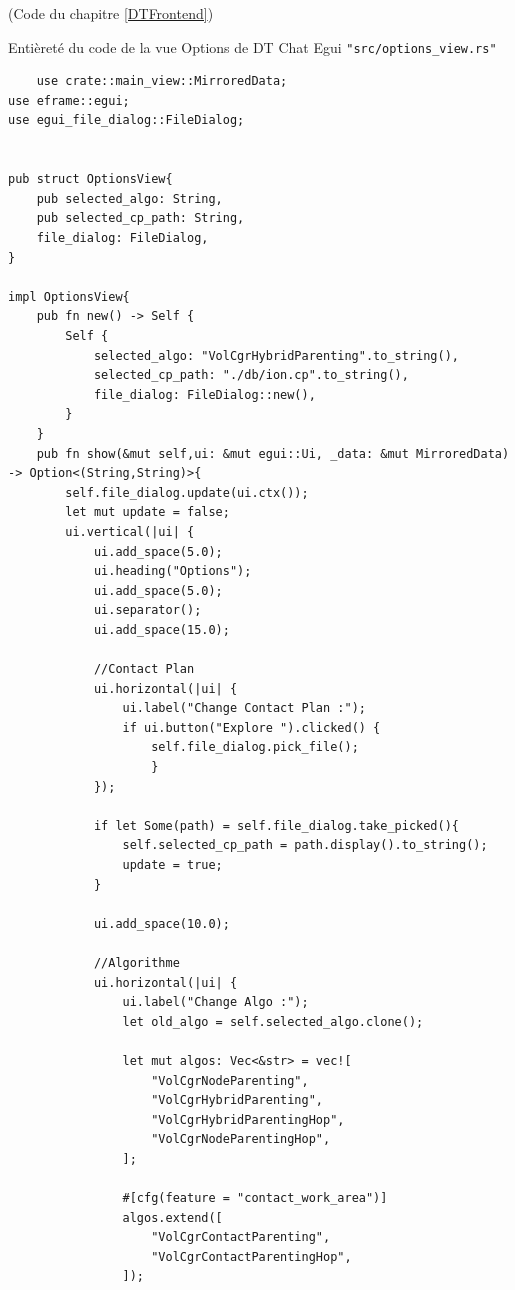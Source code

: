 \documentclass{article}
\begin{document}
\newpage
{}
(Code du chapitre \ref{DTFrontend})\\
\label{CodeDTFrontend}

Entièreté du code de la vue Options de DT Chat Egui \texttt{"src/options\_view.rs"}

\begin{verbatim}
    use crate::main_view::MirroredData;
use eframe::egui;
use egui_file_dialog::FileDialog;


pub struct OptionsView{
    pub selected_algo: String,
    pub selected_cp_path: String,
    file_dialog: FileDialog,
}

impl OptionsView{
    pub fn new() -> Self {
        Self {
            selected_algo: "VolCgrHybridParenting".to_string(),
            selected_cp_path: "./db/ion.cp".to_string(),
            file_dialog: FileDialog::new(),
        }
    }
    pub fn show(&mut self,ui: &mut egui::Ui, _data: &mut MirroredData) -> Option<(String,String)>{
        self.file_dialog.update(ui.ctx());
        let mut update = false;
        ui.vertical(|ui| {
            ui.add_space(5.0);
            ui.heading("Options");
            ui.add_space(5.0);
            ui.separator();
            ui.add_space(15.0);

            //Contact Plan
            ui.horizontal(|ui| {
                ui.label("Change Contact Plan :");
                if ui.button("Explore ").clicked() {
                    self.file_dialog.pick_file();
                    }
            });

            if let Some(path) = self.file_dialog.take_picked(){
                self.selected_cp_path = path.display().to_string();
                update = true;
            }

            ui.add_space(10.0);

            //Algorithme
            ui.horizontal(|ui| {
                ui.label("Change Algo :");
                let old_algo = self.selected_algo.clone();
                
                let mut algos: Vec<&str> = vec![
                    "VolCgrNodeParenting",
                    "VolCgrHybridParenting",
                    "VolCgrHybridParentingHop",
                    "VolCgrNodeParentingHop",
                ];

                #[cfg(feature = "contact_work_area")]
                algos.extend([
                    "VolCgrContactParenting",
                    "VolCgrContactParentingHop",
                ]);


\end{verbatim}
\end{document}

